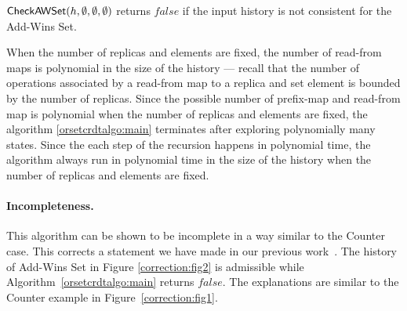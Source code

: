 \begin{theorem}

  $\mathsf{CheckAWSet}({h},\emptyset,\emptyset,\emptyset)$ returns $\mathit{false}$ if the input history is not consistent for the Add-Wins Set.

\end{theorem}

When the number of replicas and elements are fixed, the number of read-from maps is polynomial in the size of the history — recall that the number of operations associated by a read-from map to a replica and set element is bounded by the number of replicas. Since the possible number of prefix-map and read-from map is polynomial when the number of replicas and elements are fixed, the algorithm \ref{orsetcrdtalgo:main} terminates after exploring polynomially many states. Since the each step of the recursion happens in polynomial time, the algorithm always run in polynomial time in the size of the history when the number of replicas and elements are fixed. 

\paragraph{Incompleteness.} This algorithm can be shown to be incomplete in a way similar to the Counter case. This corrects a statement we have made in our previous work~\cite{DBLP:conf/cav/BiswasEE19}. The history of Add-Wins Set in Figure \ref{correction:fig2} is admissible while Algorithm~\ref{orsetcrdtalgo:main} returns $\mathit{false}$. The explanations are similar to the Counter example in Figure~\ref{correction:fig1}.



